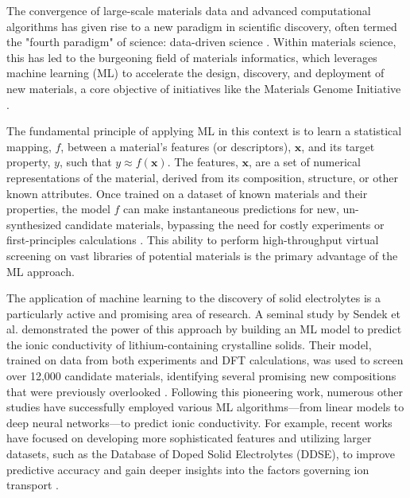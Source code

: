 The convergence of large-scale materials data and advanced computational algorithms has given rise to a new paradigm in scientific discovery, often termed the "fourth paradigm" of science: data-driven science \cite{Hey2009}. Within materials science, this has led to the burgeoning field of materials informatics, which leverages machine learning (ML) to accelerate the design, discovery, and deployment of new materials, a core objective of initiatives like the Materials Genome Initiative \cite{MGI2011}.

The fundamental principle of applying ML in this context is to learn a statistical mapping, \(f\), between a material's features (or descriptors), \(\mathbf{x}\), and its target property, \(y\), such that \(y \approx f(\mathbf{x})\). The features, \(\mathbf{x}\), are a set of numerical representations of the material, derived from its composition, structure, or other known attributes. Once trained on a dataset of known materials and their properties, the model \(f\) can make instantaneous predictions for new, un-synthesized candidate materials, bypassing the need for costly experiments or first-principles calculations \cite{Ramprasad2017}. This ability to perform high-throughput virtual screening on vast libraries of potential materials is the primary advantage of the ML approach.

The application of machine learning to the discovery of solid electrolytes is a particularly active and promising area of research. A seminal study by Sendek et al. demonstrated the power of this approach by building an ML model to predict the ionic conductivity of lithium-containing crystalline solids. Their model, trained on data from both experiments and DFT calculations, was used to screen over 12,000 candidate materials, identifying several promising new compositions that were previously overlooked \cite{Sendek2017}. Following this pioneering work, numerous other studies have successfully employed various ML algorithms—from linear models to deep neural networks—to predict ionic conductivity. For example, recent works have focused on developing more sophisticated features and utilizing larger datasets, such as the Database of Doped Solid Electrolytes (DDSE), to improve predictive accuracy and gain deeper insights into the factors governing ion transport \cite{Jalem2021, DDSE2021}.

